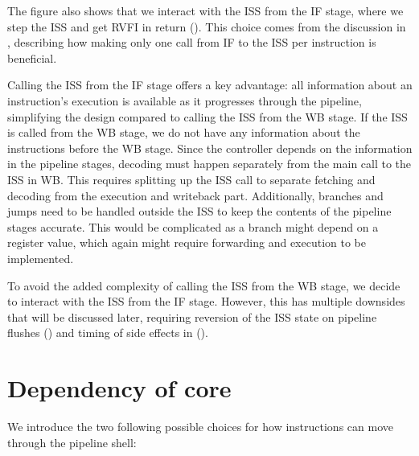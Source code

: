 The figure also shows that we interact with the ISS from the IF stage, where we step the ISS and get RVFI in return (). This choice comes from the discussion in , describing how making only one call from IF to the ISS per instruction is beneficial. 

Calling the ISS from the IF stage offers a key advantage: all information about an instruction's execution is available as it progresses through the pipeline, simplifying the design compared to calling the ISS from the WB stage. If the ISS is called from the WB stage, we do not have any information about the instructions before the WB stage. Since the controller depends on the information in the pipeline stages, decoding must happen separately from the main call to the ISS in WB. This requires splitting up the ISS call to separate fetching and decoding from the execution and writeback part. Additionally, branches and jumps need to be handled outside the ISS to keep the contents of the pipeline stages accurate. This would be complicated as a branch might depend on a register value, which again might require forwarding and execution to be implemented.

To avoid the added complexity of calling the ISS from the WB stage, we decide to interact with the ISS from the IF stage. However, this has multiple downsides that will be discussed later, requiring reversion of the ISS state on pipeline flushes () and timing of side effects in ().
%
%
%


\section{Dependency of core}
\label{sec:ps_dependency}

We introduce the two following possible choices for how instructions can move through the pipeline shell: 

